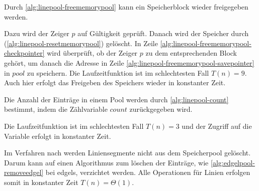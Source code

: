 Durch \autoref{alg:linepool-freememorypool} kann ein Speicherblock wieder freigegeben werden.

Dazu wird der Zeiger $p$ auf Gültigkeit geprüft. Danach wird der Speicher durch 
 (\autoref{alg:linepool-resetmemorypool}) gelöscht. In Zeile \ref{alg:linepool-freememorypool-checkpointer} wird
 überprüft, ob der Zeiger $p$ zu dem entsprechenden Block gehört, um danach die Adresse in Zeile
 \ref{alg:linepool-freememorypool-savepointer} in $\mathit{pool}$ zu speichern. Die Laufzeitfunktion ist im
 schlechtesten Fall $T(n) = 9$. Auch hier erfolgt das Freigeben des Speichers wieder in konstanter Zeit.

Die Anzahl der Einträge in einem Pool werden durch \autoref{alg:linepool-count} bestimmt, indem die Zählvariable
 $\mathit{count}$ zurückgegeben wird.

Die Laufzeitfunktion ist im schlechtesten Fall $T(n) = 3$ und der Zugriff auf die Variable erfolgt in konstanter Zeit.

Im Verfahren nach \citeauthor{clarke96} werden Liniensegmente nicht aus dem Speicherpool gelöscht. Darum kann auf
 einen Algorithmus zum löschen der Einträge, wie \autoref{alg:edgelpool-removeedgel} bei \glspl{edgel}, verzichtet
 werden. Alle Operationen für Linien erfolgen somit in konstanter Zeit $T(n) = \Theta(1)$.

